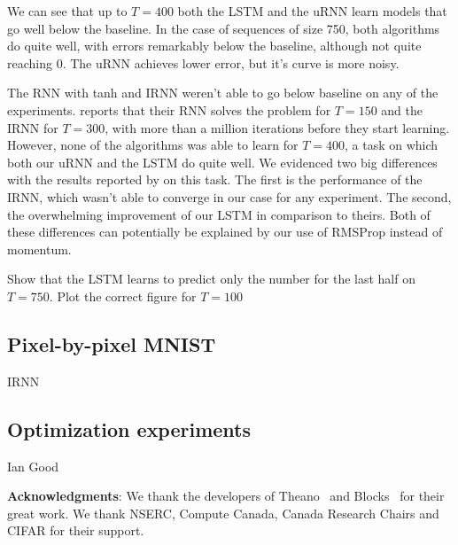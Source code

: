 \documentclass{article} %
\begin{document}
We can see that up to $T=400$ both the LSTM and the uRNN learn models that go well below the baseline. In the case of sequences of size 750, both algorithms do quite well, with errors remarkably below the baseline, although not quite reaching 0. The uRNN achieves lower error, but it's curve is more noisy.

The RNN with tanh and IRNN weren't able to go below baseline on any of the experiments. \cite{Quoc2015} reports that their RNN solves the problem for $T=150$ and the IRNN for $T=300$, with more than a million iterations before they start learning. However, none of the algorithms was able to learn for $T=400$, a task on which both our uRNN and the LSTM do quite well. We evidenced two big differences with the results reported by \cite{Quoc2015} on this task. The first is the performance of the IRNN, which wasn't able to converge in our case for any experiment. The second, the overwhelming improvement of our LSTM in comparison to theirs. Both of these differences can potentially be explained by our use of RMSProp instead of momentum.

{\color{red} Show that the LSTM learns to predict only the number for the last half on $T=750$. Plot the correct figure for $T=100$}

\subsection{Pixel-by-pixel MNIST}
IRNN

\subsection{Optimization experiments}
Ian Good

{\bf Acknowledgments}: We thank the developers of
Theano~\cite{bergstra+al:2010-scipy-small} and Blocks~\cite{blocksfuel} for %
their great work. We thank NSERC, Compute Canada, Canada Research Chairs and CIFAR for their support.



\end{document}
